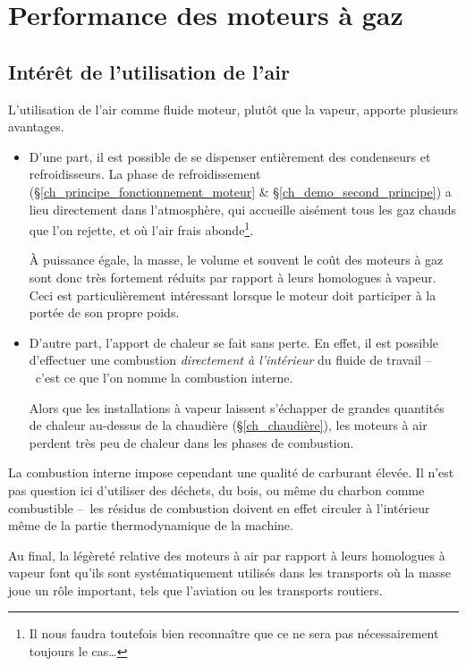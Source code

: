 \section{Performance des moteurs à gaz}

	\subsection{Intérêt de l’utilisation de l’air}

		L’utilisation de l’air comme fluide moteur, plutôt que la vapeur, apporte plusieurs avantages.

		\begin{itemize}
			\item D’une part, il est possible de se dispenser entièrement des condenseurs et refroidisseurs. La phase de refroidissement (\S\ref{ch_principe_fonctionnement_moteur} \& \S\ref{ch_demo_second_principe}) a lieu directement dans l’atmosphère, qui accueille aisément tous les gaz chauds que l’on rejette, et où l’air frais abonde\footnote{Il nous faudra toutefois bien reconnaître que ce ne sera pas nécessairement toujours le cas…}.

			À puissance égale, la masse, le volume et souvent le coût des moteurs à gaz sont donc très fortement réduits par rapport à leurs homologues à vapeur. Ceci est particulièrement intéressant lorsque le moteur doit participer à la portée de son propre poids.

			\item D’autre part, l’apport de chaleur se fait sans perte. En effet, il est possible d’ef\-fec\-tuer une combustion \emph{directement à l’intérieur} du fluide de travail --\ c’est ce que l’on nomme la combustion interne. 

			Alors que les installations à vapeur laissent s’échapper de grandes quantités de chaleur au-dessus de la chaudière (\S\ref{ch_chaudière}), les moteurs à air perdent très peu de chaleur dans les phases de combustion.

		\end{itemize}

		La combustion interne impose cependant une qualité de carburant élevée. Il n’est pas question ici d’utiliser des déchets, du bois, ou même du charbon comme combustible --\ les résidus de combustion doivent en effet circuler à l’intérieur même de la partie thermodynamique de la machine.

		Au final, la légèreté relative des moteurs à air par rapport à leurs homologues à vapeur font qu’ils sont systématiquement utilisés dans les transports où la masse joue un rôle important, tels que l’aviation ou les transports routiers.



